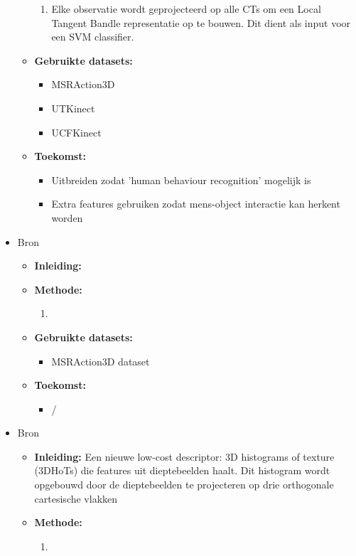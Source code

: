 \begin{itemize}
\begin{itemize}
\begin{enumerate}
			\item Elke observatie wordt geprojecteerd op alle CTs om een Local Tangent Bandle representatie op te bouwen. Dit dient als input voor een SVM classifier.
		\end{enumerate}
		\item \textbf{Gebruikte datasets:}
		\begin{itemize}
			\item MSRAction3D 
			\item UTKinect
			\item UCFKinect
		\end{itemize}
		\item \textbf{Toekomst:}
		\begin{itemize}
			\item Uitbreiden zodat 'human behaviour recognition' mogelijk is
			\item Extra features gebruiken zodat mens-object interactie kan herkent worden
		\end{itemize}
	\end{itemize}
	\item Bron \cite{Chen2016}
	\begin{itemize}
		\item \textbf{Inleiding:} 
		\item \textbf{Methode:} 
		\begin{enumerate}
			\item
		\end{enumerate}
		\item \textbf{Gebruikte datasets:}
		\begin{itemize}
			\item MSRAction3D dataset
		\end{itemize}
		\item \textbf{Toekomst:}
		\begin{itemize}
			\item /
		\end{itemize}
	\end{itemize}
	\item Bron \cite{Chen2017}
	\begin{itemize}
		\item \textbf{Inleiding:} Een nieuwe low-cost descriptor: 3D histograms of texture (3DHoTs) die features uit dieptebeelden haalt. Dit histogram wordt opgebouwd door de dieptebeelden te projecteren op drie orthogonale cartesische vlakken
		\item \textbf{Methode:} 
		\begin{enumerate}
			\item

\end{enumerate}
\end{itemize}
\end{itemize}
